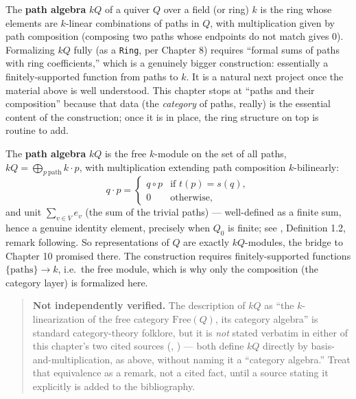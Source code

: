 The \textbf{path algebra} \(kQ\) of a quiver \(Q\) over a field (or ring) \(k\) is the ring whose elements are \(k\)-linear combinations of paths in \(Q\), with multiplication given by path composition (composing two paths whose endpoints do not match gives \(0\)). Formalizing \(kQ\) fully (as a \texttt{Ring}, per Chapter 8) requires ``formal sums of paths with ring coefficients,'' which is a genuinely bigger construction: essentially a finitely-supported function from paths to \(k\). It is a natural next project once the material above is well understood. This chapter stops at ``paths and their composition'' because that data (the \emph{category} of paths, really) is the essential content of the construction; once it is in place, the ring structure on top is routine to add.

\begin{mathreading}

The \textbf{path algebra} \(kQ\) is the free \(k\)-module on the set of all paths, \(kQ = \bigoplus_{p\ \text{path}} k\cdot p\), with multiplication extending path composition \(k\)-bilinearly: \[
q \cdot p = \begin{cases} q\circ p & \text{if } t(p) = s(q),\\ 0 &
\text{otherwise,}\end{cases}
\] and unit \(\sum_{v\in V} e_v\) (the sum of the trivial paths) --- well-defined as a finite sum, hence a genuine identity element, precisely when \(Q_0\) is finite; see \cite{AssemSimsonSkowronski2006}, Definition 1.2, remark following. So representations of \(Q\) are exactly \(kQ\)-modules, the bridge to Chapter 10 promised there. The construction requires finitely-supported functions \(\{\text{paths}\} \to k\), i.e.~the free module, which is why only the composition (the category layer) is formalized here.

\end{mathreading}

\begin{quote}
\textbf{Not independently verified.} The description of \(kQ\) as ``the \(k\)-linearization of the free category \(\mathrm{Free}(Q)\), its category algebra'' is standard category-theory folklore, but it is \emph{not} stated verbatim in either of this chapter's two cited sources (\cite{AssemSimsonSkowronski2006}, \cite{Schiffler2014}) --- both define \(kQ\) directly by basis-and-multiplication, as above, without naming it a ``category algebra.'' Treat that equivalence as a remark, not a cited fact, until a source stating it explicitly is added to the bibliography.
\end{quote}

